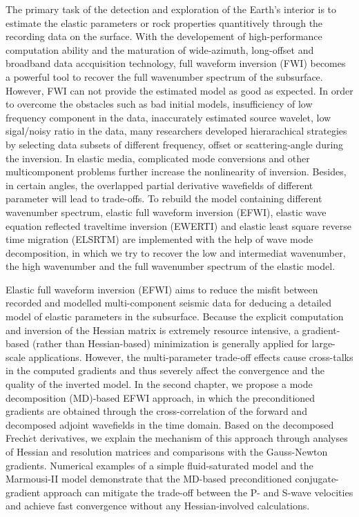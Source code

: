 \begin{eabstract}
	The primary task of the detection and exploration of the Earth's interior is to estimate the elastic parameters or rock properties
	quantitively
	through the recording data on the surface. With the developement of 
	high-performance computation ability and the
	maturation of wide-azimuth, long-offset and broadband data accquisition 
	technology, full waveform inversion (FWI) becomes a powerful tool to recover the full
	 wavenumber spectrum of the subsurface. However, FWI can not provide the estimated
	model as good as expected. In order to overcome the obstacles such as bad initial models,
	insufficiency of low frequency component in the data, inaccurately estimated source
	wavelet, low sigal/noisy ratio in the data, many researchers developed hierarachical strategies
	by selecting data subsets of different frequency, offset or scattering-angle during the
	inversion.	
	In elastic media, complicated mode conversions and other multicomponent problems further increase the
	nonlinearity of inversion. Besides, in certain angles, the overlapped partial derivative wavefields of  different
	parameter will lead to trade-offs.
	To rebuild the model containing different wavenumber spectrum, elastic full waveform
	inversion (EFWI), elastic wave equation 
	reflected traveltime inversion (EWERTI) and elastic least square reverse time
	migration (ELSRTM) are implemented with the help of wave mode decomposition, in which we
	try to recover the low and intermediat wavenumber, 
	the high wavenumber and the full wavenumber spectrum of the elastic model.

Elastic full waveform inversion (EFWI) aims to reduce the misfit between recorded and modelled multi-component
seismic data for deducing a detailed model of elastic parameters in the subsurface.
Because the explicit computation and inversion of the Hessian matrix
is extremely resource intensive,
a gradient-based (rather than Hessian-based) minimization is generally applied for large-scale applications.
However, the multi-parameter trade-off effects cause cross-talks in the computed gradients and
thus severely affect the convergence and the quality of the inverted model.
In the second chapter, we propose a mode decomposition (MD)-based EFWI approach, in which the preconditioned gradients
are obtained through the cross-correlation of the forward and
decomposed adjoint wavefields in the time domain.
Based on the decomposed Frech{$\acute{e}$}t derivatives,
we explain the mechanism of this approach through analyses of Hessian and resolution matrices
and comparisons with the Gauss-Newton gradients.
Numerical examples of a simple fluid-saturated model and the Marmousi-II model
demonstrate that the MD-based preconditioned conjugate-gradient approach
can mitigate the trade-off between the P- and S-wave velocities and achieve fast
convergence without any Hessian-involved calculations.


\end{eabstract}
